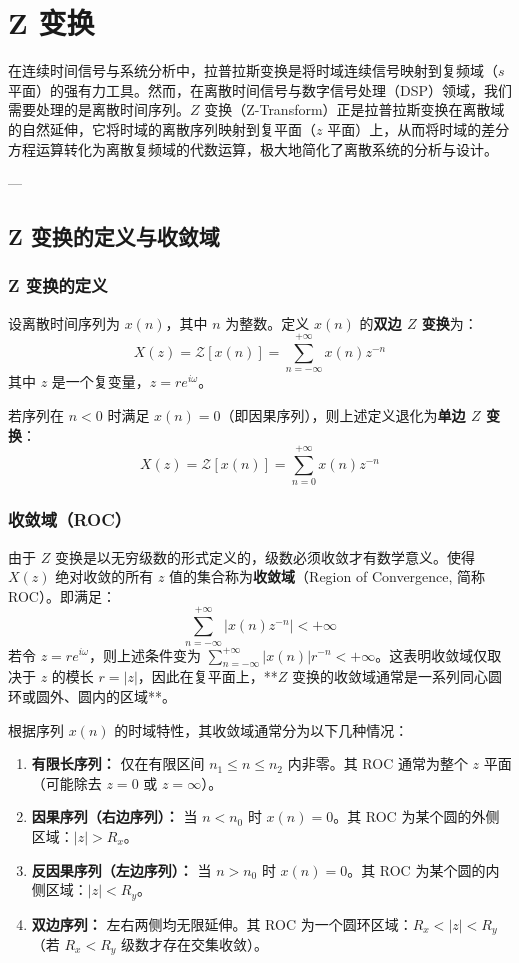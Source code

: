 \chapter{Z 变换}

在连续时间信号与系统分析中，拉普拉斯变换是将时域连续信号映射到复频域（$s$ 平面）的强有力工具。然而，在离散时间信号与数字信号处理（DSP）领域，我们需要处理的是离散时间序列。$Z$ 变换（Z-Transform）正是拉普拉斯变换在离散域的自然延伸，它将时域的离散序列映射到复平面（$z$ 平面）上，从而将时域的差分方程运算转化为离散复频域的代数运算，极大地简化了离散系统的分析与设计。

---

\section{Z 变换的定义与收敛域}

\subsection{Z 变换的定义}
\begin{tcolorbox}[colback=blue!5!white, colframe=blue!75!black, title=定义 \thechapter.1 \quad Z 变换]
	设离散时间序列为 $x(n)$，其中 $n$ 为整数。定义 $x(n)$ 的\textbf{双边 $Z$ 变换}为：
	$$ X(z) = \mathcal{Z}[x(n)] = \sum_{n=-\infty}^{+\infty} x(n) z^{-n} $$
	其中 $z$ 是一个复变量，$z = r e^{i\omega}$。
	
	若序列在 $n < 0$ 时满足 $x(n) = 0$（即因果序列），则上述定义退化为\textbf{单边 $Z$ 变换}：
	$$ X(z) = \mathcal{Z}[x(n)] = \sum_{n=0}^{+\infty} x(n) z^{-n} $$
\end{tcolorbox}

\subsection{收敛域（ROC）}
由于 $Z$ 变换是以无穷级数的形式定义的，级数必须收敛才有数学意义。使得 $X(z)$ 绝对收敛的所有 $z$ 值的集合称为\textbf{收敛域}（Region of Convergence, 简称 ROC）。即满足：
$$ \sum_{n=-\infty}^{+\infty} |x(n) z^{-n}| < +\infty $$
若令 $z = r e^{i\omega}$，则上述条件变为 $\sum_{n=-\infty}^{+\infty} |x(n)| r^{-n} < +\infty$。这表明收敛域仅取决于 $z$ 的模长 $r = |z|$，因此在复平面上，**$Z$ 变换的收敛域通常是一系列同心圆环或圆外、圆内的区域**。

根据序列 $x(n)$ 的时域特性，其收敛域通常分为以下几种情况：
\begin{enumerate}
	\item \textbf{有限长序列：} 仅在有限区间 $n_1 \le n \le n_2$ 内非零。其 ROC 通常为整个 $z$ 平面（可能除去 $z=0$ 或 $z=\infty$）。
	\item \textbf{因果序列（右边序列）：} 当 $n < n_0$ 时 $x(n) = 0$。其 ROC 为某个圆的外侧区域：$|z| > R_x$。
	\item \textbf{反因果序列（左边序列）：} 当 $n > n_0$ 时 $x(n) = 0$。其 ROC 为某个圆的内侧区域：$|z| < R_y$。
	\item \textbf{双边序列：} 左右两侧均无限延伸。其 ROC 为一个圆环区域：$R_x < |z| < R_y$（若 $R_x < R_y$ 级数才存在交集收敛）。
\end{enumerate}

